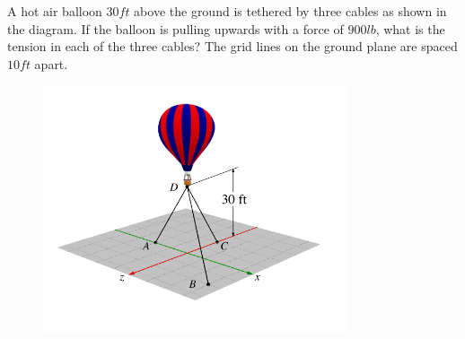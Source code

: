 
A hot air balloon $30 ft$ above the ground is tethered by three cables as shown in the diagram. If the balloon is pulling upwards with a force of $900 lb$, what is the tension in each of the three cables? The grid lines on the ground plane are spaced $10 ft$ apart.

\begin{figure}[ht!]
  \centering
  \includegraphics[width=0.8\textwidth,height=0.5\textheight,keepaspectratio]{fig.png}
\end{figure}




